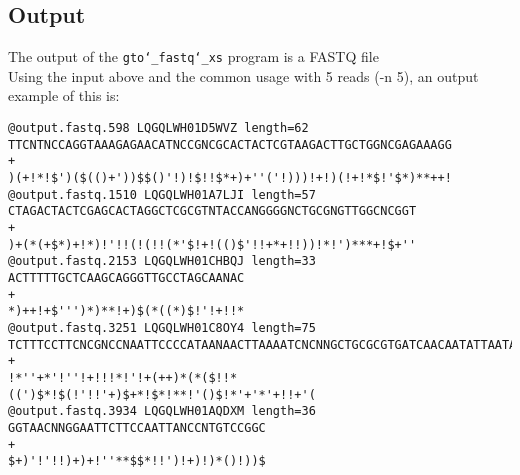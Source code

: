 \subsection*{Output}
The output of the \texttt{gto\char`_fastq\char`_xs} program is a FASTQ file\\
Using the input above and the common usage with 5 reads (-n 5), an output example of this is:
\begin{lstlisting}
@output.fastq.598 LQGQLWH01D5WVZ length=62
TTCNTNCCAGGTAAAGAGAACATNCCGNCGCACTACTCGTAAGACTTGCTGGNCGAGAAAGG
+
)(+!*!$')($(()+'))$$()'!)!$!!$*+)+''('!)))!+!)(!+!*$!'$*)**++!
@output.fastq.1510 LQGQLWH01A7LJI length=57
CTAGACTACTCGAGCACTAGGCTCGCGTNTACCANGGGGNCTGCGNGTTGGCNCGGT
+
)+(*(+$*)+!*)!'!!(!(!!(*'$!+!(()$'!!+*+!!))!*!')***+!$+''
@output.fastq.2153 LQGQLWH01CHBQJ length=33
ACTTTTTGCTCAAGCAGGGTTGCCTAGCAANAC
+
*)++!+$''')*)**!+)$(*((*)$!'!+!!*
@output.fastq.3251 LQGQLWH01C8OY4 length=75
TCTTTCCTTCNCGNCCNAATTCCCCATAANAACTTAAAATCNCNNGCTGCGCGTGATCAACAATATTAATACTCC
+
!*''+*'!''!+!!!*!'!+(++)*(*($!!*((')$*!$(!'!!'+)$+*!$*!**!'()$!*'+'*'+!!+'(
@output.fastq.3934 LQGQLWH01AQDXM length=36
GGTAACNNGGAATTCTTCCAATTANCCNTGTCCGGC
+
$+)'!'!!)+)+!''**$$*!!')!+)!)*()!))$
\end{lstlisting}